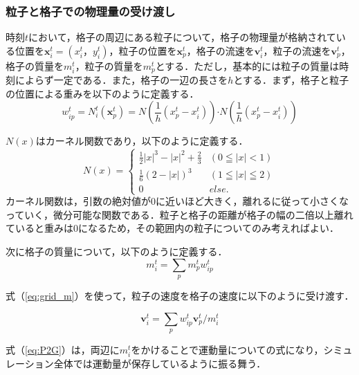 \documentclass[a4j,12pt]{jreport}
\begin{document}
\subsubsection{粒子と格子での物理量の受け渡し} \label{subsec:P2GG2P}
時刻$t$において，格子の周辺にある粒子について，格子の物理量が格納されている位置を$\bm{x}^t_i = (x^t_i，y^t_i)$，粒子の位置を$\bm{x}^t_p$，格子の流速を$\bm{v}^t_i$，粒子の流速を$\bm{v}^t_p$，格子の質量を$m^t_i$，粒子の質量を$m^t_p$とする．ただし，基本的には粒子の質量は時刻によらず一定である．また，格子の一辺の長さを$h$とする．まず，格子と粒子の位置による重みを以下のように定義する．
\begin{equation}\label{eq:weight}
w^t_{ip} = N^t_i(\bm{x}^t_p) = N(\frac{1}{h}(x^t_p - x^t_i))\boldsymbol{\cdot}N(\frac{1}{h}(x^t_p - x^t_i))
\end{equation} 

$N(x)$はカーネル関数であり，以下のように定義する．
\begin{equation}\label{eq:kernel}
N(x) = 
\begin{cases}
\frac{1}{2}|x|^3 - |x|^2 + \frac{2}{3} & (0\leqq|x|<1) \\
\frac{1}{6}(2-|x|)^3 & (1\leqq|x|\leqq2) \\
0 & else.
\end{cases}
\end{equation} 
カーネル関数は，引数の絶対値が0に近いほど大きく，離れるに従って小さくなっていく，微分可能な関数である．粒子と格子の距離が格子の幅の二倍以上離れていると重みは0になるため，その範囲内の粒子についてのみ考えればよい．

次に格子の質量について，以下のように定義する．
\begin{equation}\label{eq:grid_m}
m^t_i = \sum\limits_p m^t_pw^t_{ip}
\end{equation} 

式（\ref{eq:grid_m}）を使って，粒子の速度を格子の速度に以下のように受け渡す．

\begin{equation}\label{eq:P2G}
\bm{v}^t_i = \sum\limits_p w^t_{ip}\bm{v}^t_p / m^t_i
\end{equation} 

式（\ref{eq:P2G}）は，両辺に$m^t_i$をかけることで運動量についての式になり，シミュレーション全体では運動量が保存しているように振る舞う．
\end{document}
